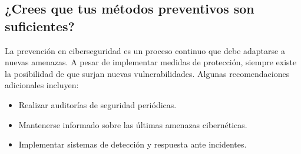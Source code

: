 \subsection{¿Crees que tus métodos preventivos son suficientes?}
La prevención en ciberseguridad es un proceso continuo que debe adaptarse a nuevas amenazas. A pesar de implementar medidas de protección, siempre existe la posibilidad de que surjan nuevas vulnerabilidades. Algunas recomendaciones adicionales incluyen:
\begin{itemize}
    \item Realizar auditorías de seguridad periódicas.
    \item Mantenerse informado sobre las últimas amenazas cibernéticas.
    \item Implementar sistemas de detección y respuesta ante incidentes.
\end{itemize}
